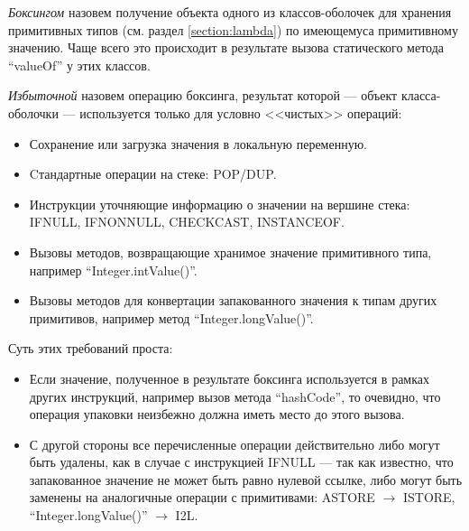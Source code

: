 \textit{Боксингом} назовем получение объекта одного из классов-оболочек для хранения примитивных
типов (см. раздел \ref{section:lambda}) по имеющемуса примитивному значению.
Чаще всего это происходит в результате вызова статического метода ``valueOf'' у этих классов.

\textit{Избыточной} назовем операцию боксинга, результат которой --- объект класса-оболочки ---
используется только для условно <<чистых>> операций:
\begin{itemize}
    \item Сохранение или загрузка значения в локальную переменную.
    \item Cтандартные операции на стеке: POP/DUP.
    \item Инструкции уточняющие информацию о значении на вершине стека: IFNULL, IFNONNULL,
    CHECKCAST, INSTANCEOF.
    \item Вызовы методов, возвращающие хранимое значение примитивного типа, например
    ``Integer.intValue()''.
    \item Вызовы методов для конвертации запакованного значения к типам других примитивов,
    например метод ``Integer.longValue()''.
\end{itemize}

Суть этих требований проста:
\begin{itemize}
    \item Если значение, полученное в результате боксинга используется в рамках других инструкций,
    например вызов метода ``hashCode'', то очевидно, что операция упаковки неизбежно должна иметь
    место до этого вызова.

    \item С другой стороны все перечисленные операции действительно либо могут быть удалены, как
    в случае с инструкцией IFNULL --- так как известно, что запакованное значение не может быть
    равно нулевой ссылке, либо могут быть заменены на аналогичные операции с примитивами:
    ASTORE $\to$ ISTORE, ``Integer.longValue()'' $\to$ I2L.
\end{itemize}

